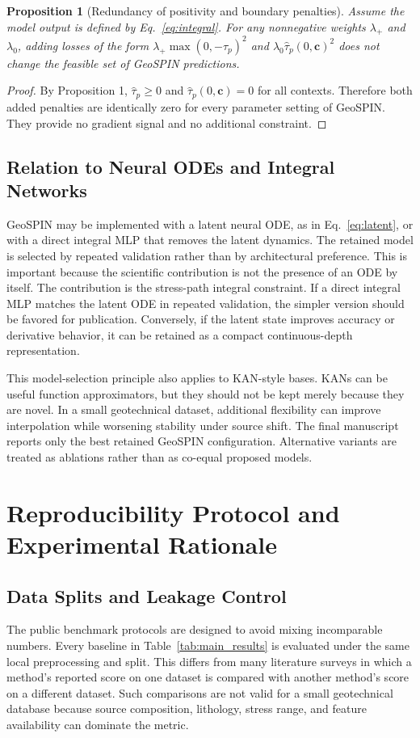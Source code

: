 \documentclass[journal]{IEEEtran}
\newtheorem{proposition}{Proposition}
\begin{document}
\begin{proposition}[Redundancy of positivity and boundary penalties]
Assume the model output is defined by Eq.~\eqref{eq:integral}. For any nonnegative weights $\lambda_{+}$ and $\lambda_0$, adding losses of the form $\lambda_{+}\max(0,-\widehat{\tau}_p)^2$ and $\lambda_0\widehat{\tau}_p(0,\mathbf{c})^2$ does not change the feasible set of GeoSPIN predictions.
\end{proposition}

\begin{proof}
By Proposition 1, $\widehat{\tau}_p\ge0$ and $\widehat{\tau}_p(0,\mathbf{c})=0$ for all contexts. Therefore both added penalties are identically zero for every parameter setting of GeoSPIN. They provide no gradient signal and no additional constraint.
\end{proof}

\subsection{Relation to Neural ODEs and Integral Networks}
GeoSPIN may be implemented with a latent neural ODE, as in Eq.~\eqref{eq:latent}, or with a direct integral MLP that removes the latent dynamics. The retained model is selected by repeated validation rather than by architectural preference. This is important because the scientific contribution is not the presence of an ODE by itself. The contribution is the stress-path integral constraint. If a direct integral MLP matches the latent ODE in repeated validation, the simpler version should be favored for publication. Conversely, if the latent state improves accuracy or derivative behavior, it can be retained as a compact continuous-depth representation.

This model-selection principle also applies to KAN-style bases. KANs can be useful function approximators, but they should not be kept merely because they are novel. In a small geotechnical dataset, additional flexibility can improve interpolation while worsening stability under source shift. The final manuscript reports only the best retained GeoSPIN configuration. Alternative variants are treated as ablations rather than as co-equal proposed models.

\section{Reproducibility Protocol and Experimental Rationale}
\subsection{Data Splits and Leakage Control}
The public benchmark protocols are designed to avoid mixing incomparable numbers. Every baseline in Table~\ref{tab:main_results} is evaluated under the same local preprocessing and split. This differs from many literature surveys in which a method's reported score on one dataset is compared with another method's score on a different dataset. Such comparisons are not valid for a small geotechnical database because source composition, lithology, stress range, and feature availability can dominate the metric.
\end{document}
